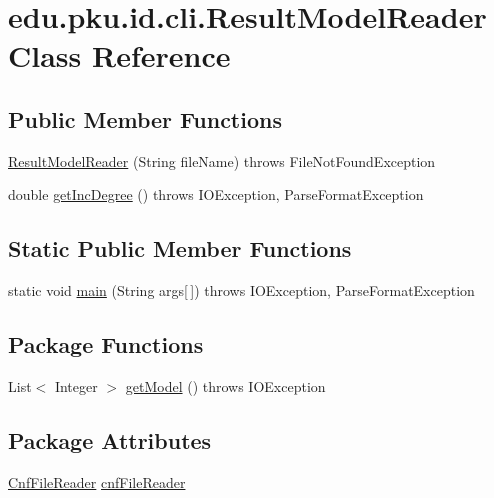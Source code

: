 \hypertarget{classedu_1_1pku_1_1id_1_1cli_1_1_result_model_reader}{
\section{edu.pku.id.cli.ResultModelReader Class Reference}
\label{classedu_1_1pku_1_1id_1_1cli_1_1_result_model_reader}
}
\subsection*{Public Member Functions}
\begin{DoxyCompactItemize}
\item 
\hyperlink{classedu_1_1pku_1_1id_1_1cli_1_1_result_model_reader_ab8e7736607cf9b562ff875ddb8d74c2c}{ResultModelReader} (String fileName)  throws FileNotFoundException 
\item 
double \hyperlink{classedu_1_1pku_1_1id_1_1cli_1_1_result_model_reader_a02a2080025d02a493b189390a4621921}{getIncDegree} ()  throws IOException, ParseFormatException 
\end{DoxyCompactItemize}
\subsection*{Static Public Member Functions}
\begin{DoxyCompactItemize}
\item 
static void \hyperlink{classedu_1_1pku_1_1id_1_1cli_1_1_result_model_reader_af394e32ff1c7eb3f05cecbf3283ae5bc}{main} (String args\mbox{[}$\,$\mbox{]})  throws IOException, ParseFormatException 
\end{DoxyCompactItemize}
\subsection*{Package Functions}
\begin{DoxyCompactItemize}
\item 
List$<$ Integer $>$ \hyperlink{classedu_1_1pku_1_1id_1_1cli_1_1_result_model_reader_a22451691cab76d90ca75d31fb6963e26}{getModel} ()  throws IOException 
\end{DoxyCompactItemize}
\subsection*{Package Attributes}
\begin{DoxyCompactItemize}
\item 
\hyperlink{classedu_1_1pku_1_1id_1_1_cnf_file_reader}{CnfFileReader} \hyperlink{classedu_1_1pku_1_1id_1_1cli_1_1_result_model_reader_a187962842c15d8aa1f28cc70cfd2bc6a}{cnfFileReader}
\end{DoxyCompactItemize}
